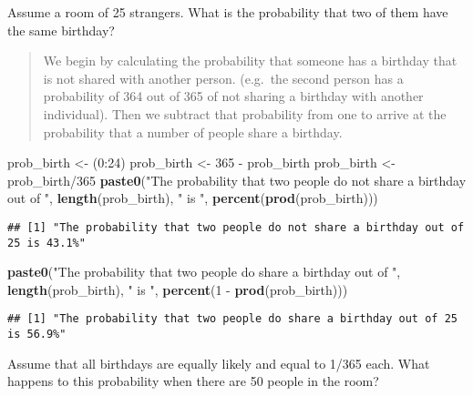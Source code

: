 \documentclass[]{article}
\newenvironment{Shaded}{\begin{snugshade}}{\end{snugshade}}
\newcommand{\KeywordTok}[1]{\textcolor[rgb]{0.13,0.29,0.53}{\textbf{{#1}}}}
\newcommand{\DecValTok}[1]{\textcolor[rgb]{0.00,0.00,0.81}{{#1}}}
\newcommand{\StringTok}[1]{\textcolor[rgb]{0.31,0.60,0.02}{{#1}}}
\newcommand{\NormalTok}[1]{{#1}}
\begin{document}
Assume a room of 25 strangers. What is the probability that two of them
have the same birthday?

\begin{quote}
We begin by calculating the probability that someone has a birthday that
is not shared with another person. (e.g.~the second person has a
probability of 364 out of 365 of not sharing a birthday with another
individual). Then we subtract that probability from one to arrive at the
probability that a number of people share a birthday.
\end{quote}

\begin{Shaded}
\begin{Highlighting}[]
\NormalTok{prob_birth <-}\StringTok{ }\NormalTok{(}\DecValTok{0}\NormalTok{:}\DecValTok{24}\NormalTok{)}
\NormalTok{prob_birth <-}\StringTok{ }\DecValTok{365} \NormalTok{-}\StringTok{ }\NormalTok{prob_birth}
\NormalTok{prob_birth <-}\StringTok{ }\NormalTok{prob_birth/}\DecValTok{365}
\KeywordTok{paste0}\NormalTok{(}\StringTok{"The probability that two people do not share a birthday out of "}\NormalTok{, }
       \KeywordTok{length}\NormalTok{(prob_birth), }\StringTok{" is "}\NormalTok{, }\KeywordTok{percent}\NormalTok{(}\KeywordTok{prod}\NormalTok{(prob_birth)))}
\end{Highlighting}
\end{Shaded}

\begin{verbatim}
## [1] "The probability that two people do not share a birthday out of 25 is 43.1%"
\end{verbatim}

\begin{Shaded}
\begin{Highlighting}[]
\KeywordTok{paste0}\NormalTok{(}\StringTok{"The probability that two people do share a birthday out of "}\NormalTok{, }
       \KeywordTok{length}\NormalTok{(prob_birth), }\StringTok{" is "}\NormalTok{, }\KeywordTok{percent}\NormalTok{(}\DecValTok{1} \NormalTok{-}\StringTok{ }\KeywordTok{prod}\NormalTok{(prob_birth)))}
\end{Highlighting}
\end{Shaded}

\begin{verbatim}
## [1] "The probability that two people do share a birthday out of 25 is 56.9%"
\end{verbatim}

Assume that all birthdays are equally likely and equal to 1/365 each.
What happens to this probability when there are 50 people in the room?
\end{document}
